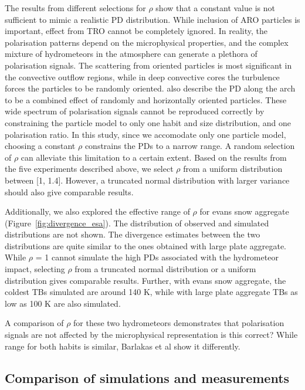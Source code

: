 \documentclass[amt, manuscript]{copernicus}
\newcommand{\todo}[1]{{\color{red} #1}}
\begin{document}
The results from different selections for $\rho$ show that a constant value is not sufficient to mimic a realistic PD distribution. While inclusion of ARO particles is important, effect from TRO cannot be completely ignored. In reality, the polarisation patterns depend on the microphysical properties, and the complex mixture of hydrometeors in the atmosphere can generate a plethora of polarisation signals. The scattering from oriented particles is most significant in the convective outflow regions, while in deep convective cores the turbulence forces the particles to be randomly oriented. \citet{gong:micro:17} also describe the PD along the arch to be a combined effect of randomly and horizontally oriented particles. These wide spectrum of polarisation signals cannot be reproduced correctly by constraining the particle model to only one habit and size distribution, and one polarisation ratio. In this study, since we accomodate only one particle model, choosing a constant $\rho$ constrains the PDs to a narrow range. A random selection of $\rho$ can alleviate this limitation to a certain extent. Based on the results from the five experiments described above, we select $\rho$ from a uniform distribution between [1, 1.4]. However, a truncated normal distribution with larger variance should also give comparable results. 


Additionally, we also explored the effective range of $\rho$ for evans snow aggregate (Figure~\ref{fig:divergence_esa}). The distribution of observed and simulated distributions are not shown. The divergence estimates between the two distributions are quite similar to the ones obtained with large plate aggregate. While $\rho$ = 1 cannot simulate the high PDs associated with the hydrometeor impact, selecting $\rho$ from a truncated normal distribution or a uniform distribution gives comparable results. Further, with evans snow aggregate, the coldest  TBs simulated are around 140\,\,K, while with large plate aggregate TBs as low as 100\,\,K are also simulated. 

A comparison of $\rho$ for these two hydrometeors demonstrates that polarisation signals are not affected by the microphysical representation \todo{is this correct? While range for both habits is similar, Barlakas et al show it differently. }  

\subsection{Comparison of simulations and measurements}
\label{sec:comparison_sim_obs}
\end{document}
